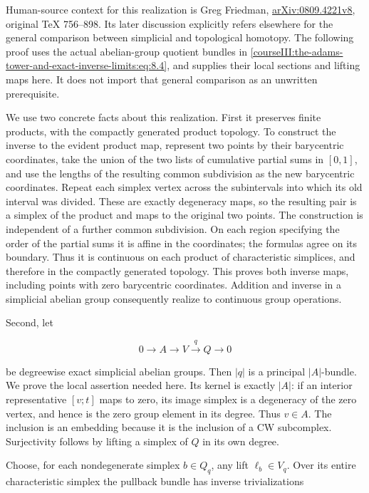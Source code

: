 Human-source context for this realization is Greg Friedman, \href{https://arxiv.org/abs/0809.4221v8}{arXiv:0809.4221v8}, original TeX 756--898. Its later discussion explicitly refers elsewhere for the general comparison between simplicial and topological homotopy. The following proof uses the actual abelian-group quotient bundles in \eqref{courseIII:the-adams-tower-and-exact-inverse-limits:eq:8.4}, and supplies their local sections and lifting maps here. It does not import that general comparison as an unwritten prerequisite.

We use two concrete facts about this realization. First it preserves finite products, with the compactly generated product topology. To construct the inverse to the evident product map, represent two points by their barycentric coordinates, take the union of the two lists of cumulative partial sums in \([0,1]\), and use the lengths of the resulting common subdivision as the new barycentric coordinates. Repeat each simplex vertex across the subintervals into which its old interval was divided. These are exactly degeneracy maps, so the resulting pair is a simplex of the product and maps to the original two points. The construction is independent of a further common subdivision. On each region specifying the order of the partial sums it is affine in the coordinates; the formulas agree on its boundary. Thus it is continuous on each product of characteristic simplices, and therefore in the compactly generated topology. This proves both inverse maps, including points with zero barycentric coordinates. Addition and inverse in a simplicial abelian group consequently realize to continuous group operations.

Second, let

\begin{equation}
0\longrightarrow A\longrightarrow V\xrightarrow{q}Q\longrightarrow0
 \label{courseIII:the-adams-tower-and-exact-inverse-limits:eq:9.1}
\end{equation}

be degreewise exact simplicial abelian groups. Then \(|q|\) is a principal \(|A|\)-bundle. We prove the local assertion needed here. Its kernel is exactly \(|A|\): if an interior representative \([v;t]\) maps to zero, its image simplex is a degeneracy of the zero vertex, and hence is the zero group element in its degree. Thus \(v\in A\). The inclusion is an embedding because it is the inclusion of a CW subcomplex. Surjectivity follows by lifting a simplex of \(Q\) in its own degree.

Choose, for each nondegenerate simplex \(b\in Q_q\), any lift \(\ell_b\in V_q\). Over its entire characteristic simplex the pullback bundle has inverse trivializations

